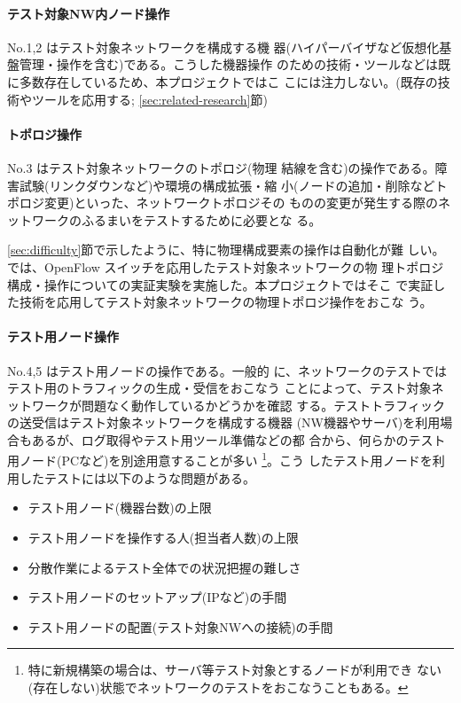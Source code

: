     \paragraph{テスト対象NW内ノード操作}
 No.1,2 はテスト対象ネットワークを構成する機
器(ハイパーバイザなど仮想化基盤管理・操作を含む)である。こうした機器操作
のための技術・ツールなどは既に多数存在しているため、本プロジェクトではこ
こには注力しない。(既存の技術やツールを応用する;
\ref{sec:related-research}節)

    \paragraph{トポロジ操作}
 No.3 はテスト対象ネットワークのトポロジ(物理
結線を含む)の操作である。障害試験(リンクダウンなど)や環境の構成拡張・縮
小(ノードの追加・削除などトポロジ変更)といった、ネットワークトポロジその
ものの変更が発生する際のネットワークのふるまいをテストするために必要とな
る。

\ref{sec:difficulty}節で示したように、特に物理構成要素の操作は自動化が難
しい。\lopj では、OpenFlow スイッチを応用したテスト対象ネットワークの物
理トポロジ構成・操作についての実証実験を実施した。本プロジェクトではそこ
で実証した技術を応用してテスト対象ネットワークの物理トポロジ操作をおこな
う。

    \paragraph{テスト用ノード操作}
 No.4,5 はテスト用ノードの操作である。一般的
に、ネットワークのテストではテスト用のトラフィックの生成・受信をおこなう
ことによって、テスト対象ネットワークが問題なく動作しているかどうかを確認
する。テストトラフィックの送受信はテスト対象ネットワークを構成する機器
(NW機器やサーバ)を利用場合もあるが、ログ取得やテスト用ツール準備などの都
合から、何らかのテスト用ノード(PCなど)を別途用意することが多い
\footnote{特に新規構築の場合は、サーバ等テスト対象とするノードが利用でき
ない(存在しない)状態でネットワークのテストをおこなうこともある。}。こう
したテスト用ノードを利用したテストには以下のような問題がある。
\begin{itemize}
 \item テスト用ノード(機器台数)の上限
 \item テスト用ノードを操作する人(担当者人数)の上限
 \item 分散作業によるテスト全体での状況把握の難しさ
 \item テスト用ノードのセットアップ(IPなど)の手間
 \item テスト用ノードの配置(テスト対象NWへの接続)の手間
\end{itemize}

